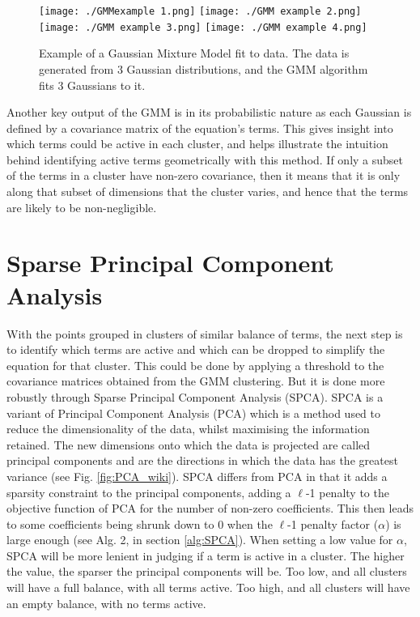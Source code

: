 \documentclass[12pt]{report} %
\begin{document}
\begin{figure}[htbp]
  \centering
  \texttt{[image: ./GMMexample 1.png]}
  \texttt{[image: ./GMM example 2.png]}
  \texttt{[image: ./GMM example 3.png]}
  \texttt{[image: ./GMM example 4.png]}
  \caption{Example of a Gaussian Mixture Model fit to data. The data is generated from 3 Gaussian distributions, and the GMM algorithm fits 3 Gaussians to it. \cite[1D Example Notebook]{gmm_towardsdatascience}}
  \label{fig:GMM_example}
\end{figure}

\vspace{5mm}

Another key output of the GMM is in its probabilistic nature as each Gaussian is defined by a covariance matrix of the equation's terms. This gives insight into which terms could be active in each cluster, and helps illustrate the intuition behind identifying active terms geometrically with this method. If only a subset of the terms in a cluster have non-zero covariance, then it means that it is only along that subset of dimensions that the cluster varies, and hence that the terms are likely to be non-negligible.

\section{Sparse Principal Component Analysis}

With the points grouped in clusters of similar balance of terms, the next step is to identify which terms are active and which can be dropped to simplify the equation for that cluster. This could be done by applying a threshold to the covariance matrices obtained from the GMM clustering. But it is done more robustly through Sparse Principal Component Analysis (SPCA). SPCA is a variant of Principal Component Analysis (PCA) which is a method used to reduce the dimensionality of the data, whilst maximising the information retained. The new dimensions onto which the data is projected are called principal components and are the directions in which the data has the greatest variance\cite{lever2017principal} (see Fig. \ref{fig:PCA_wiki}). SPCA differs from PCA in that it adds a sparsity constraint to the principal components, adding a $\ell$-1 penalty to the objective function of PCA for the number of non-zero coefficients. This then leads to some coefficients being shrunk down to 0 when the $\ell$-1 penalty factor ($\alpha$) is large enough\cite{zou2006sparse} (see Alg. 2, in section \ref{alg:SPCA}). When setting a low value for $\alpha$, SPCA will be more lenient in judging if a term is active in a cluster. The higher the value, the sparser the principal components will be. Too low, and all clusters will have a full balance, with all terms active. Too high, and all clusters will have an empty balance, with no terms active.
\end{document}
